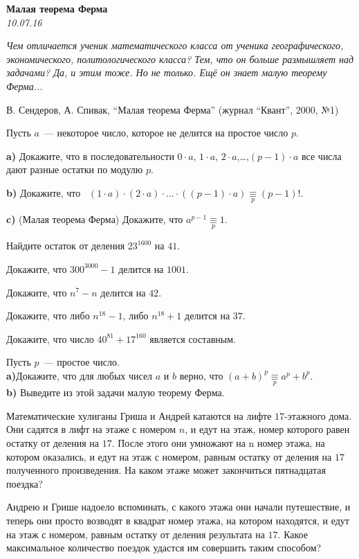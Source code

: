 \begin{center}
\textbf{\Large Малая теорема Ферма}\\
\textit{10.07.16}
\end{center}

\epigraph{\it Чем отличается ученик математического класса от ученика географического, экономического, политологического класса? Тем, что он больше размышляет над задачами? Да, и этим тоже. Но не только. Ещё он знает малую теорему Ферма...}{В. Сендеров, А. Спивак, ``Малая теорема Ферма'' (журнал ``Квант'', 2000, №1)}

\begin{problems}

\item Пусть $a$~--- некоторое число, которое не делится на простое число $p$.

\textbf{a)} Докажите, что в последовательности $0\cdot a$, $1\cdot a$, $2\cdot a$,\ldots,$(p-1)\cdot a$ все числа дают разные остатки по модулю $p$.

\textbf{b)} Докажите, что ~$(1\cdot a) \cdot (2\cdot a) \cdot \ldots\cdot ((p-1)\cdot a) \mathop{\equiv}\limits_p (p-1)!$.

\textbf{c)} (Малая теорема Ферма) Докажите, что $a^{p-1} \mathop{\equiv}\limits_p 1$.

 
\item Найдите остаток от деления $23^{1600}$ на $41$.
\item Докажите, что $300^{3000}-1$ делится на $1001$.
\item Докажите, что  $n^7-n$ делится на $42$. 
\item Докажите, что либо $n^{18}-1$, либо $n^{18}+1$ делится на $37$.
\item Докажите, что число $40^{81}+17^{160}$ является составным.
\item Пусть $p$~--- простое число.\\ \textbf{a)}Докажите, что для любых чисел $a$ и $b$ верно, что $(a+b)^p \mathop{\equiv}\limits_p a^p+b^p$.\\
\textbf{b)} Выведите из этой задачи малую теорему Ферма.
\item 	Математические хулиганы Гриша и Андрей катаются на лифте $17$-этажного дома. Они садятся в лифт на этаже с номером $n$,  и едут на этаж, номер которого равен остатку от деления  на $17$. После этого  они умножают на n номер этажа, на котором оказались, и едут на этаж с номером, равным остатку от деления на $17$ полученного произведения. На каком этаже может закончиться пятнадцатая  поездка?

\item Андрею и Грише надоело вспоминать, с какого этажа они начали путешествие, и теперь они просто возводят в квадрат номер этажа, на котором находятся, и едут на этаж с номером, равным остатку от деления результата на $17$. Какое максимальное количество поездок удастся им совершить таким способом?
\end{problems}

